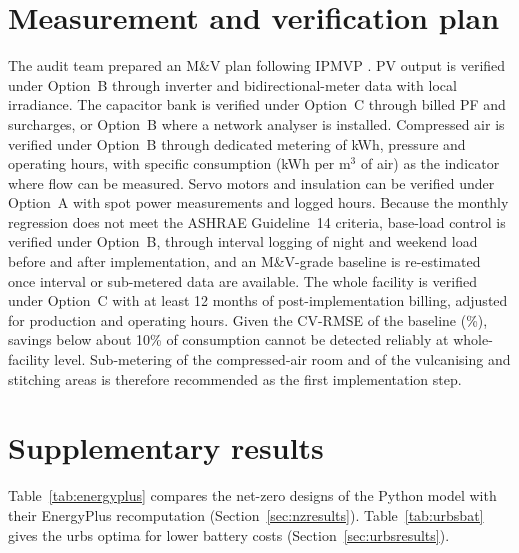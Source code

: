 \documentclass[preprint,12pt,authoryear]{elsarticle}
\begin{document}
\section{Measurement and verification plan}
\label{app:mv}
The audit team prepared an M\&V plan following IPMVP \citep{evo2022ipmvp}. PV output is verified under Option~B through inverter and bidirectional-meter data with local irradiance. The capacitor bank is verified under Option~C through billed PF and surcharges, or Option~B where a network analyser is installed. Compressed air is verified under Option~B through dedicated metering of kWh, pressure and operating hours, with specific consumption (kWh per m$^3$ of air) as the indicator where flow can be measured. Servo motors and insulation can be verified under Option~A with spot power measurements and logged hours. Because the monthly regression does not meet the ASHRAE Guideline~14 criteria, base-load control is verified under Option~B, through interval logging of night and weekend load before and after implementation, and an M\&V-grade baseline is re-estimated once interval or sub-metered data are available. The whole facility is verified under Option~C with at least 12 months of post-implementation billing, adjusted for production and operating hours. Given the CV-RMSE of the baseline (\nCVExcl\%), savings below about 10\% of consumption cannot be detected reliably at whole-facility level. Sub-metering of the compressed-air room and of the vulcanising and stitching areas is therefore recommended as the first implementation step.

\section{Supplementary results}
\label{app:supp}
Table~\ref{tab:energyplus} compares the net-zero designs of the Python model with their EnergyPlus recomputation (Section~\ref{sec:nzresults}). Table~\ref{tab:urbsbat} gives the urbs optima for lower battery costs (Section~\ref{sec:urbsresults}).







\end{document}
